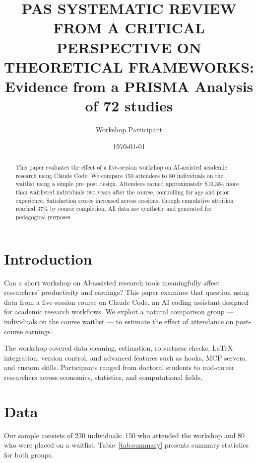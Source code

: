 \documentclass[12pt]{article}
\title{PAS SYSTEMATIC REVIEW FROM A CRITICAL PERSPECTIVE ON THEORETICAL FRAMEWORKS:\\ Evidence from a PRISMA Analysis of 72 studies}
\author{Workshop Participant}
\date{\today}
\begin{document}
\maketitle

\begin{abstract}
This paper evaluates the effect of a five-session workshop on AI-assisted academic research using Claude Code. We compare 150 attendees to 80 individuals on the waitlist using a simple pre--post design. Attendees earned approximately \$16,384 more than waitlisted individuals two years after the course, controlling for age and prior experience. Satisfaction scores increased across sessions, though cumulative attrition reached 37\% by course completion. All data are synthetic and generated for pedagogical purposes.
\end{abstract}

\section{Introduction}

Can a short workshop on AI-assisted research tools meaningfully affect researchers' productivity and earnings? This paper examines that question using data from a five-session course on Claude Code, an AI coding assistant designed for academic research workflows. We exploit a natural comparison group --- individuals on the course waitlist --- to estimate the effect of attendance on post-course earnings.

The workshop covered data cleaning, estimation, robustness checks, \LaTeX{} integration, version control, and advanced features such as hooks, MCP servers, and custom skills. Participants ranged from doctoral students to mid-career researchers across economics, statistics, and computational fields.

\section{Data}

Our sample consists of 230 individuals: 150 who attended the workshop and 80 who were placed on a waitlist. Table~\ref{tab:summary} presents summary statistics for both groups.

\begin{table}[H]
\centering
\caption{Summary Statistics by Attendance Status}
\label{tab:summary}

\end{table}
\end{document}
